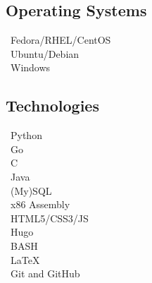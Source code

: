 \documentclass{article}
\begin{document}
\begin{paracol}{2}
    \begin{tcolorbox}
        \subsection*{Operating Systems}
        \textcolor[HTML]{EE0000}{\faRedhat} \ Fedora/RHEL/CentOS \\
        \textcolor[HTML]{E95420}{\faUbuntu} \ Ubuntu/Debian \\
        \textcolor[HTML]{0078D6}{\faWindows} \ Windows
    \end{tcolorbox}

    \begin{tcolorbox}
        \subsection*{Technologies}
        \faPython \ Python \\
        \faGoogle \ Go \\
        \faFileCode \ C \\
        \faJava \ Java \\
        \faDatabase \ (My)SQL \\
        \faMicrochip \ x86 Assembly \\
        \faCode \ HTML5/CSS3/JS \\
        \faGlobe \ Hugo \\
        \faTerminal \ BASH \\
        \faFilePdf \ LaTeX \\
        \faGithub \ Git and GitHub
    \end{tcolorbox}

    \vspace{105pt}

    \begin{flushright}
        \hypersetup{urlcolor=black}
    \end{flushright}
\end{paracol}
\end{document}
